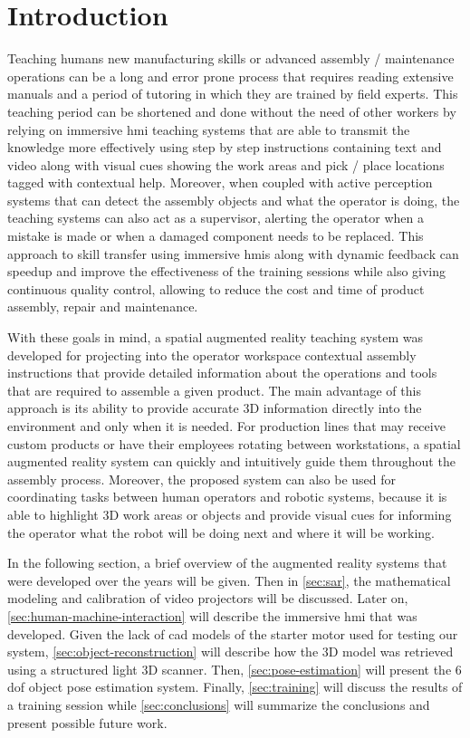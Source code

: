 \section{Introduction}\label{sec:introduction}

Teaching humans new manufacturing skills or advanced assembly / maintenance operations can be a long and error prone process that requires reading extensive manuals and a period of tutoring in which they are trained by field experts. This teaching period can be shortened and done without the need of other workers by relying on immersive \gls{hmi} teaching systems that are able to transmit the knowledge more effectively using step by step instructions containing text and video along with visual cues showing the work areas and pick / place locations tagged with contextual help. Moreover, when coupled with active perception systems that can detect the assembly objects and what the operator is doing, the teaching systems can also act as a supervisor, alerting the operator when a mistake is made or when a damaged component needs to be replaced. This approach to skill transfer using immersive \glspl{hmi} along with dynamic feedback can speedup and improve the effectiveness of the training sessions while also giving continuous quality control, allowing to reduce the cost and time of product assembly, repair and maintenance.

With these goals in mind, a spatial augmented reality teaching system was developed for projecting into the operator workspace contextual assembly instructions that provide detailed information about the operations and tools that are required to assemble a given product. The main advantage of this approach is its ability to provide accurate 3D information directly into the environment and only when it is needed. For production lines that may receive custom products or have their employees rotating between workstations, a spatial augmented reality system can quickly and intuitively guide them throughout the assembly process. Moreover, the proposed system can also be used for coordinating tasks between human operators and robotic systems, because it is able to highlight 3D work areas or objects and provide visual cues for informing the operator what the robot will be doing next and where it will be working.

In the following section, a brief overview of the augmented reality systems that were developed over the years will be given. Then in \cref{sec:sar}, the mathematical modeling and calibration of video projectors will be discussed. Later on, \cref{sec:human-machine-interaction} will describe the immersive \gls{hmi} that was developed. Given the lack of \gls{cad} models of the starter motor used for testing our system, \cref{sec:object-reconstruction} will describe how the 3D model was retrieved using a structured light 3D scanner. Then, \cref{sec:pose-estimation} will present the 6 \gls{dof} object pose estimation system. Finally, \cref{sec:training} will discuss the results of a training session while \cref{sec:conclusions} will summarize the conclusions and present possible future work.
